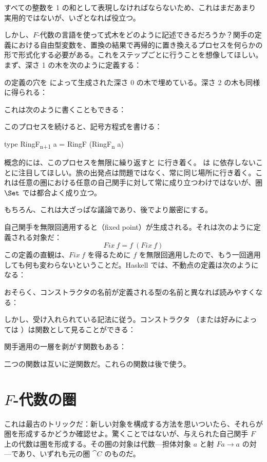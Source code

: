 すべての整数を 1 の和として表現しなければならないため、これはまだあまり実用的ではないが、いざとなれば役立つ。

しかし、$F$-代数の言語を使って式木をどのように記述できるだろうか？関手の定義における自由型変数を、置換の結果で再帰的に置き換えるプロセスを何らかの形で形式化する必要がある。これをステップごとに行うことを想像してほしい。まず、深さ 1 の木を次のように定義する：

 の定義の穴を  によって生成された深さ 0 の木で埋めている。深さ 2 の木も同様に得られる：

これは次のように書くこともできる：

このプロセスを続けると、記号方程式を書ける：

\begin{snipv}
type RingF\textsubscript{n+1} a = RingF (RingF\textsubscript{n} a)
\end{snipv}
概念的には、このプロセスを無限に繰り返すと  に行き着く。 は  に依存しないことに注目してほしい。旅の出発点は問題ではなく、常に同じ場所に行き着く。これは任意の圏における任意の自己関手に対して常に成り立つわけではないが、圏 $\Set$ では都合よく成り立つ。

もちろん、これは大ざっぱな議論であり、後でより厳密にする。

自己関手を無限回適用すると（fixed point）が生成される。それは次のように定義される対象だ：
\[\mathit{Fix}\ f = f\ (\mathit{Fix}\ f)\]
この定義の直観は、$\mathit{Fix}\ f$ を得るために $f$ を無限回適用したので、もう一回適用しても何も変わらないということだ。Haskell では、不動点の定義は次のようになる：

おそらく、コンストラクタの名前が定義される型の名前と異なれば読みやすくなる：

しかし、受け入れられている記法に従う。コンストラクタ （または好みによっては ）は関数として見ることができる：

関手適用の一層を剥がす関数もある：

二つの関数は互いに逆関数だ。これらの関数は後で使う。

\section{$F$-代数の圏}

これは最古のトリックだ：新しい対象を構成する方法を思いついたら、それらが圏を形成するかどうか確認せよ。驚くことではないが、与えられた自己関手 $F$ 上の代数は圏を形成する。その圏の対象は代数—担体対象 $a$ と射 $F a \to a$ の対—であり、いずれも元の圏 $\cat{C}$ のものだ。

